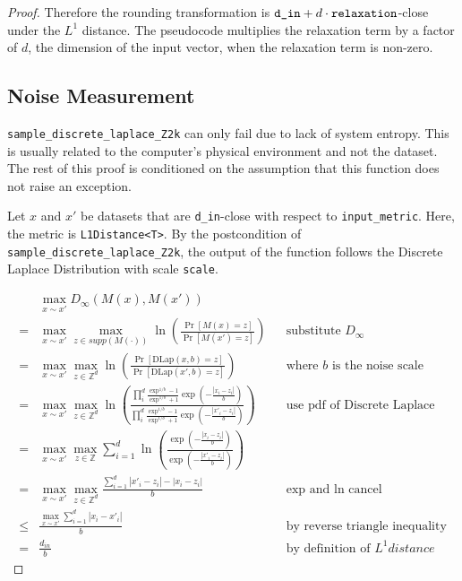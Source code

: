 \documentclass{article}
\begin{document}
\begin{proof}
Therefore the rounding transformation is $\texttt{d\_in} + d \cdot \texttt{relaxation}$-close under the $L^1$ distance.
The pseudocode multiplies the relaxation term by a factor of $d$, the dimension of the input vector,
when the relaxation term is non-zero.

\subsection{Noise Measurement}
\texttt{sample\_discrete\_laplace\_Z2k} can only fail due to lack of system entropy. 
This is usually related to the computer's physical environment and not the dataset. 
The rest of this proof is conditioned on the assumption that this function does not raise an exception. 

Let $x$ and $x'$ be datasets that are \texttt{d\_in}-close with respect to \texttt{input\_metric}.
Here, the metric is \texttt{L1Distance<T>}.
By the postcondition of \texttt{sample\_discrete\_laplace\_Z2k},
the output of the function follows the Discrete Laplace Distribution with scale \texttt{scale}.

\begin{align*}
    & \max_{x \sim x'} D_{\infty}(M(x), M(x'))  \\
    =& \max_{x \sim x'} \max_{z \in supp(M(\cdot))} \ln\left(\frac{\Pr\left[M(x) = z\right]}{\Pr\left[M(x') = z \right]}\right)
        &&\text{substitute } D_{\infty}\\
    =& \max_{x \sim x'} \max_{z \in \mathbb{Z}^d} \ln\left(\frac{\Pr\left[\mathrm{DLap}(x, b) = z \right]}{\Pr\left[\mathrm{DLap}(x', b) = z\right]}\right)
        &&\text{where } b \text{ is the noise scale} \\
    =& \max_{x \sim x'} \max_{z \in \mathbb{Z}^d} \ln\left(\frac{
        \prod_i^d \frac{\exp^{1/b} - 1}{\exp^{1/b} + 1} \exp \left( -\frac{|x_i - z_i|}{b} \right)
    }{
        \prod_i^d \frac{\exp^{1/b} - 1}{\exp^{1/b} + 1} \exp \left( -\frac{|x'_i - z_i|}{b} \right)
    }\right) 
        &&\text{use pdf of Discrete Laplace} \\
    =& \max_{x \sim x'} \max_{z \in \mathbb{Z}} \sum_{i=1}^d \ln\left(\frac{
        \exp \left( -\frac{|x_i - z_i|}{b} \right)
    }{
        \exp \left( -\frac{|x'_i - z_i|}{b} \right)
    }\right) \\
    =& \max_{x \sim x'} \max_{z \in \mathbb{Z}^d} \frac{\sum_{i=1}^d |x'_i - z_i| - |x_i - z_i|}{b}&& \text{exp and ln cancel} \\
    \leq& \frac{\max_{x \sim x'} \sum_{i=1}^d |x_i - x'_i|}{b} &&\text{by reverse triangle inequality} \\
    =& \frac{d_{in}}{b}  &&\text{by definition of } L^1 { distance}
\end{align*}


\end{proof}
\end{document}
